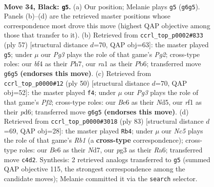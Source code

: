\documentclass[11pt]{article}
\begin{document}
\clearpage

\begin{figure}[p]\centering
\begin{subfigure}{0.46\textwidth}\centering
\resizebox{\linewidth}{!}{%
\newchessgame
\chessboard[
  setfen={5r2/r7/p1B1bkp1/p4p1p/2n2B2/P4PP1/1P5P/RK3RN1 b - - 5 34},
  showmover=false,
  pgfstyle=straightmove, color=movearrow, markmove={g6-g5}
]}
\caption{}
\end{subfigure}\hfill
\begin{subfigure}{0.46\textwidth}\centering
\resizebox{\linewidth}{!}{%
\newchessgame
\chessboard[
  setfen={5rk1/5ppp/1pB1p3/pPb1P3/5n2/2P4P/2P3P1/R3R2K b - - 1 29},
  showmover=false,
  pgfstyle=straightmove, color=movearrow, markmove={g7-g5}
]}
\caption{}
\end{subfigure}
\\[4pt]
\begin{subfigure}{0.46\textwidth}\centering
\resizebox{\linewidth}{!}{%
\newchessgame
\chessboard[
  setfen={2b2rk1/1r3p1p/3p2p1/3Np1n1/4P3/2P3PP/R4PB1/3R2K1 w - - 0 26},
  showmover=false,
  pgfstyle=straightmove, color=movearrow, markmove={f2-f4}
]}
\caption{}
\end{subfigure}\hfill
\begin{subfigure}{0.46\textwidth}\centering
\resizebox{\linewidth}{!}{%
\newchessgame
\chessboard[
  setfen={1r6/3n4/r2pbk1p/p3pp2/N1P5/RP5P/R4PP1/3B2K1 b - - 6 42},
  showmover=false,
  pgfstyle=straightmove, color=movearrow, markmove={b8-b4}
]}
\caption{}
\end{subfigure}
\caption{\textbf{Move 34, Black: \texttt{g5}.} (a) Our position; Melanie plays \texttt{g5} (\texttt{g6g5}). Panels (b)--(d) are the retrieved master positions whose correspondence most drove this move (highest QAP objective among those that transfer to it). (b) Retrieved from \texttt{ccrl\_top\_p0002\#833} (ply 57) [structural distance $d$=70, QAP obj=63]: the master played \texttt{g5}; under $\mu$ our \emph{Pg3} plays the role of that game's \emph{Pg2}; cross-type roles: our \emph{b}f4 as their \emph{P}h7, our \emph{r}a1 as their \emph{P}b6; transferred move \texttt{g6g5} \textbf{(endorses this move)}. (c) Retrieved from \texttt{ccrl\_top\_p0000\#12} (ply 50) [structural distance $d$=70, QAP obj=52]: the master played \texttt{f4}; under $\mu$ our \emph{Pg3} plays the role of that game's \emph{Pf2}; cross-type roles: our \emph{B}e6 as their \emph{N}d5, our \emph{r}f1 as their \emph{p}d6; transferred move \texttt{g6g5} \textbf{(endorses this move)}. (d) Retrieved from \texttt{ccrl\_top\_p0000\#3018} (ply 83) [structural distance $d$=69, QAP obj=28]: the master played \texttt{Rb4}; under $\mu$ our \emph{Nc5} plays the role of that game's \emph{Rb1} (a \textbf{cross-type} correspondence); cross-type roles: our \emph{B}e6 as their \emph{N}d7, our \emph{p}g3 as their \emph{R}a6; transferred move \texttt{c4d2}. Synthesis: 2 retrieved analogs transferred to \texttt{g5} (summed QAP objective 115, the strongest correspondence among the candidate moves); Melanie committed it via the \texttt{search} selector.}
\label{fig:thought-m67}
\end{figure}
\end{document}
